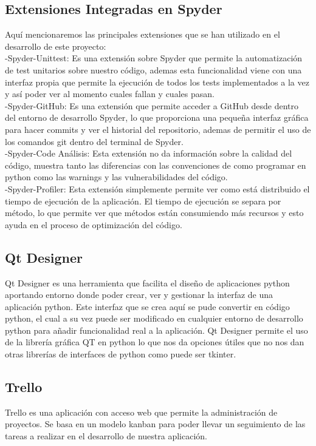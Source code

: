 \documentclass[12pt,a4paper]{article}
\begin{document}
\subsection{Extensiones Integradas en Spyder}
Aquí mencionaremos las principales extensiones que se han utilizado en el desarrollo de este proyecto:\\
-Spyder-Unittest: Es una extensión sobre Spyder que permite la automatización de test unitarios sobre nuestro código, ademas esta funcionalidad viene con una interfaz propia que permite la ejecución de todos los tests implementados a la vez y así poder ver al momento cuales fallan y cuales pasan.\\
-Spyder-GitHub: Es una extensión que permite acceder a GitHub desde dentro del entorno de desarrollo Spyder, lo que proporciona una pequeña interfaz gráfica para hacer commits y ver el historial del repositorio, ademas de permitir el uso de los comandos git dentro del terminal de Spyder.\\
-Spyder-Code Análisis: Esta extensión no da información sobre la calidad del código, muestra tanto las diferencias con las convenciones de como programar en python como las warnings y las vulnerabilidades del código.\\
-Spyder-Profiler: Esta extensión simplemente permite ver como está distribuido el tiempo de ejecución de la aplicación. El tiempo de ejecución se separa por método, lo que permite ver que métodos están consumiendo más recursos y esto ayuda en el proceso de optimización del código.\\
\subsection{Qt Designer}
Qt Designer es una herramienta que facilita el diseño de aplicaciones python aportando entorno donde poder crear, ver y gestionar la interfaz de una aplicación python. Este interfaz que se crea aquí se pude convertir en código python, el cual a su vez puede ser modificado en cualquier entorno de desarrollo python para añadir funcionalidad real a la aplicación. Qt Designer permite el uso de la librería gráfica QT en python lo que nos da opciones útiles que no nos dan otras librerías de interfaces de python como puede ser tkinter.\\
\subsection{Trello}
Trello es una aplicación con acceso web que permite la administración de proyectos. Se basa en un modelo kanban para poder llevar un seguimiento de las tareas a realizar en el desarrollo de nuestra aplicación.\\
\end{document}
